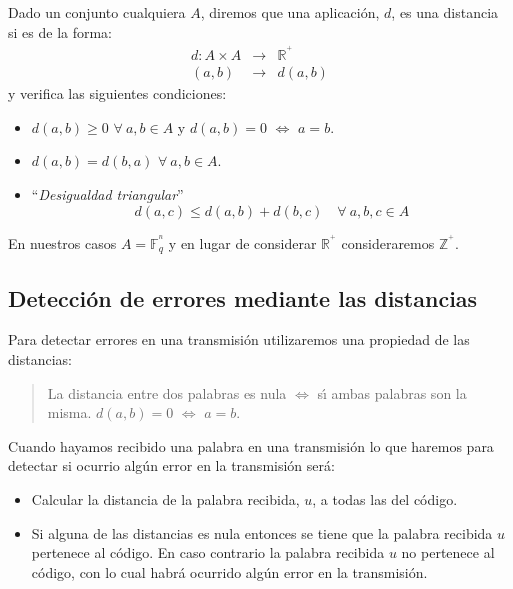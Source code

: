 Dado un conjunto cualquiera $A$, diremos que una aplicaci\'on, $d$, es una
distancia si es de la forma:
\begin{eqnarray*}
d: A\times A&\longrightarrow& \mathbb{R}^{^+}\\
(a,b)&\longrightarrow& d(a,b)
\end{eqnarray*}
y verifica las siguientes condiciones:
\begin{itemize}
\item $d(a,b)\geq 0$ $\forall \ a,b \in A$ y $d(a,b)=0$ $\Longleftrightarrow$
$a=b$.
\item $d(a,b)=d(b,a)$ $\forall \ a,b\in A$.
\item ``\emph{Desigualdad triangular}''
\begin{displaymath}
d(a,c)\leq d(a,b) + d(b,c)\quad \forall \ a,b,c\in A
\end{displaymath}
\end{itemize}
En nuestros casos $A=\mathbb{F}^{^n}_q$ y en lugar de considerar
$\mathbb{R}^{^+}$ consideraremos $\mathbb{Z}^{^+}$.

\subsection{Detecci\'on de errores mediante las distancias}\label{sec:DistanErr}

Para detectar errores en una transmisi\'on utilizaremos una propiedad de las
distancias:
\begin{quote}
La distancia entre dos palabras es nula $\Longleftrightarrow$ s\'{\i} ambas
palabras son la misma. $d(a,b)=0$ $\Longleftrightarrow$ $a=b$.
\end{quote}
Cuando hayamos recibido una palabra en una transmisi\'on lo que haremos para
detectar si ocurrio alg\'un error en la transmisi\'on ser\'a:
\begin{itemize}
\item Calcular la distancia de la palabra recibida, $u$, a todas las del
c\'odigo.
\item Si alguna de las distancias es nula entonces se tiene que la palabra
recibida $u$ pertenece al c\'odigo. En caso contrario la palabra recibida $u$
no pertenece al c\'odigo, con lo cual habr\'a ocurrido alg\'un error en la
transmisi\'on.
\end{itemize}
